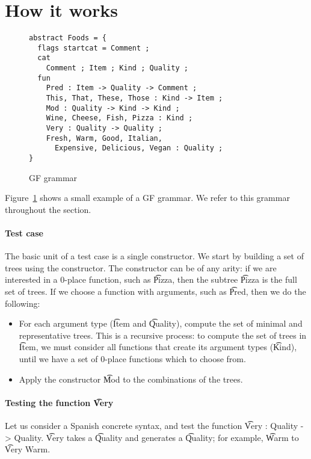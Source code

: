 \section{How it works}


\begin{figure}[h]

  \centering
    \begin{verbatim}
abstract Foods = {
  flags startcat = Comment ;
  cat
    Comment ; Item ; Kind ; Quality ;
  fun
    Pred : Item -> Quality -> Comment ;
    This, That, These, Those : Kind -> Item ;
    Mod : Quality -> Kind -> Kind ;
    Wine, Cheese, Fish, Pizza : Kind ;
    Very : Quality -> Quality ;
    Fresh, Warm, Good, Italian, 
      Expensive, Delicious, Vegan : Quality ;
}
    \end{verbatim}
  \caption{GF grammar}
\label{fig:exampleGrammar}
\end{figure}

Figure~\ref{fig:exampleGrammar} shows a small example of a GF grammar. We refer to this grammar throughout the section.

\paragraph{Test case} 
The basic unit of a test case is a single constructor. 
We start by building a set of trees using the constructor.
The constructor can be of any arity: if we are interested in a 0-place function, such as \t{Pizza}, then the subtree \t{Pizza} is the full set of trees. If we choose a function with arguments, such as \t{Pred}, then we do the following:
\begin{itemize}
\item For each argument type (\t{Item} and \t{Quality}), compute the set of minimal and representative trees. This is a recursive process: to compute the set of trees in \t{Item}, we must consider all functions that create its argument types (\t{Kind}), until we have a set of 0-place functions which to choose from.
\item Apply the constructor \t{Mod} to the combinations of the trees.
\end{itemize}

\paragraph{Testing the function \t{Very}}
Let us consider a Spanish concrete syntax, and test the function \t{Very : Quality -> Quality}.
\t{Very} takes a \t{Quality} and generates a \t{Quality}; for example, \t{Warm} to \t{Very Warm}.

